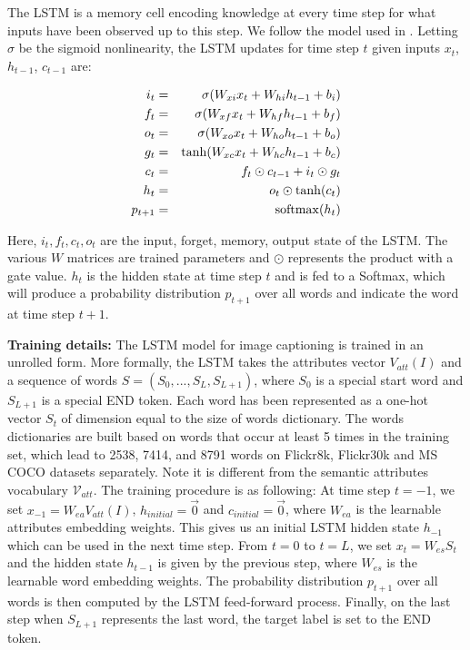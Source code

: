 \documentclass[10pt,journal,compsoc]{IEEEtran}
\def\Att{{V_{att}}}
\begin{document}
The LSTM is a memory cell encoding knowledge at every time step for what inputs have been observed up to this step. We follow the model used in \cite{zaremba2014learning}. Letting $\sigma$ be the sigmoid nonlinearity, the LSTM updates for time step $t$ given inputs $x_t$, $h_{t-1}$, $c_{t-1}$ are:

\vspace{-10pt}
\begin{eqnarray}
  i_t &=& \sigma(W_{xi}x_t+W_{hi}h_{t-1}+b_i) \\
  f_t &=& \sigma(W_{xf}x_t+W_{hf}h_{t-1}+b_f) \\
  o_t &=& \sigma(W_{xo}x_t+W_{ho}h_{t-1}+b_o) \\
  g_t &=& \tanh(W_{xc}x_t+W_{hc}h_{t-1}+b_c) \\
  c_t &=& f_t\odot c_{t-1}+i_t\odot g_t \\
  h_t &=& o_t \odot \tanh(c_t) \\
  p_{t+1} &=& {\rm softmax}(h_t)
\end{eqnarray}

Here, $i_t, f_t, c_t, o_t$ are the input, forget, memory, output state of the LSTM. The various $W$ matrices are trained parameters and $\odot$ represents the product with a gate value. $h_t$ is the hidden state at time step $t$ and is fed to a Softmax, which will produce a probability distribution $p_{t+1}$ over all words and indicate the word at time step $t+1$.

\vspace{3pt}
\noindent \textbf{Training details:} The LSTM model for image captioning is trained in an unrolled form. More formally, the LSTM takes the attributes vector $\Att(I)$ and a sequence of words $S=(S_0,...,S_L,S_{L+1})$, where $S_0$ is a special start word and $S_{L+1}$ is a special END token. Each word has been represented as a one-hot vector $S_t$ of dimension equal to the size of words dictionary. The words dictionaries are built based on words that occur at least 5 times in the training set, which lead to 2538, 7414, and 8791 words on Flickr8k, Flickr30k and MS COCO datasets separately. Note it is different from the semantic attributes vocabulary $\mathcal{V}_{att}$. The training procedure is as following: At time step $t=-1$, we set $x_{-1}=W_{ea}\Att(I)$, $h_{initial}=\vec{0}$ and $c_{initial}=\vec{0}$, where $W_{ea}$ is the learnable attributes embedding weights. This gives us an initial LSTM hidden state $h_{-1}$ which can be used in the next time step. From $t=0$ to $t=L$, we set $x_t=W_{es}S_t$ and the hidden state $h_{t-1}$ is given by the previous step, where $W_{es}$ is the learnable word embedding weights. The probability distribution $p_{t+1}$ over all words is then computed by the LSTM feed-forward process. Finally, on the last step when $S_{L+1}$ represents the last word, the target label is set to the END token.
\end{document}
